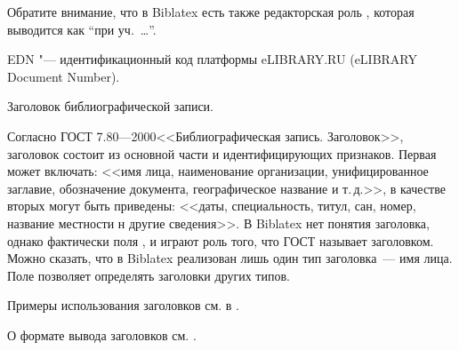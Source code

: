 \documentclass[10pt,a4paper,headings=small,numbers=enddot,english,russian]{ltxdockit}
\newcommand*{\biblatex}{Biblatex\xspace}
\newcommand*{\gostheadname}[1][]{ГОСТ#1 7.80---2000\xspace}
\begin{document}
\begin{fieldlist}
Обратите внимание, что в \biblatex есть также редакторская роль ,
которая выводится как \enquote{при уч.~\ldots}.


EDN "--- идентификационный код платформы eLIBRARY.RU
(\foreignlanguage{english}{eLIBRARY Document Number}). 


Заголовок библиографической записи.

Согласно \gostheadname <<Библиографическая запись. Заголовок>>,
заголовок состоит из основной части и идентифицирующих признаков.
Первая может включать: <<имя лица, наименование организации, унифицированное
заглавие, обозначение документа, географическое название и т.\,д.>>,
в качестве вторых могут быть приведены: <<даты,
специальность, титул, сан, номер, название местности н другие сведения>>.
В \biblatex нет понятия заголовка, однако фактически поля ,  и
 играют роль того, что ГОСТ называет заголовком. Можно сказать,
что в \biblatex реализован лишь один тип заголовка~--- имя лица. Поле 
позволяет определять заголовки других типов.%

Примеры использования заголовков см. в .

О формате вывода заголовков см. .



\end{fieldlist}
\end{document}
